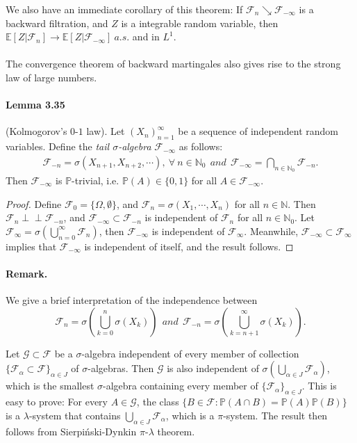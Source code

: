 \documentclass{article}
\numberwithin{equation}{section}
\newcommand{\E}{\mathbb{E}}
\newcommand{\ind}{\perp\!\!\!\perp}
\renewcommand{\P}{\mathbb{P}}
\theoremstyle{plain}
\theoremstyle{definition}
\begin{document}
We also have an immediate corollary of this theorem: If $\mathscr{F}_n\searrow\mathscr{F}_{-\infty}$ is a backward filtration, and $Z$ is a integrable random variable, then $\E[Z|\mathscr{F}_n]\to \E[Z|\mathscr{F}_{-\infty}]\ a.s.$ and in $L^1$. 

\paragraph{} The convergence theorem of backward martingales also gives rise to the strong law of large numbers.

\paragraph{Lemma 3.35\label{lemma:3.35}} (Kolmogorov's $0$-$1$ law). Let $(X_n)_{n=1}^\infty$ be a sequence of independent random variables. Define the \textit{tail $\sigma$-algebra} $\mathscr{F}_{-\infty}$ as follows:
\begin{align*}
	\mathscr{F}_{-n}=\sigma(X_{n+1},X_{n+2},\cdots),\ \forall\ n\in\mathbb{N}_0\ \ \textit{and}\ \ \mathscr{F}_{-\infty}=\bigcap_{n\in\mathbb{N}_0}\mathscr{F}_{-n}.
\end{align*}
Then $\mathscr{F}_{-\infty}$ is $\P$-trivial, i.e. $\P(A)\in\{0,1\}$ for all $A\in\mathscr{F}_{-\infty}$.
\begin{proof}
Define $\mathscr{F}_0=\{\Omega,\emptyset\}$, and $\mathscr{F}_n=\sigma(X_1,\cdots,X_n)$ for all $n\in\mathbb{N}$. Then $\mathscr{F}_n\ind\mathscr{F}_{-n}$, and $\mathscr{F}_{-\infty}\subset\mathscr{F}_{-n}$ is independent of $\mathscr{F}_n$ for all $n\in\mathbb{N}_0$. Let $\mathscr{F}_\infty=\sigma\left(\bigcup_{n=0}^\infty\mathscr{F}_n\right)$, then $\mathscr{F}_{-\infty}$ is independent of $\mathscr{F}_\infty$. Meanwhile, $\mathscr{F}_{-\infty}\subset\mathscr{F}_\infty$ implies that $\mathscr{F}_{-\infty}$ is independent of itself, and the result follows. 
\end{proof}

\paragraph{Remark.} We give a brief interpretation of the independence between $$\mathscr{F}_n=\sigma\left(\bigcup_{k=0}^n\sigma(X_k)\right)\ \ and\ \  \mathscr{F}_{-n}=\sigma\left(\bigcup_{k=n+1}^\infty\sigma(X_k)\right).$$

Let $\mathscr{G}\subset\mathscr{F}$ be a $\sigma$-algebra independent of every member of collection $\{\mathscr{F_\alpha}\subset\mathscr{F}\}_{\alpha\in J}$ of $\sigma$-algebras. Then $\mathscr{G}$ is also independent of $\sigma\left(\bigcup_{\alpha\in J}\mathscr{F}_\alpha\right)$, which is the smallest $\sigma$-algebra containing every member of $\{\mathscr{F_\alpha}\}_{\alpha\in J}$. This is easy to prove: For every $A\in\mathscr{G}$, the class $\{B\in\mathscr{F}:\P(A\cap B)=\P(A)\P(B)\}$ is a $\lambda$-system that contains $\bigcup_{\alpha\in J}\mathscr{F}_\alpha$, which is a $\pi$-system. The result then follows from Sierpiński-Dynkin $\pi$-$\lambda$ theorem.\vspace{0.1cm}
\end{document}

